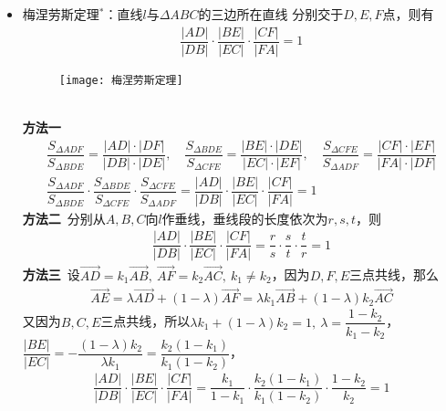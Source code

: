 \begin{itemize}[leftmargin=\inteval{\myitemleftmargin}pt,itemsep=
   \inteval{\myitemitempsep}pt,topsep=\inteval{\myitemtopsep}pt]
\item 梅涅劳斯定理$ ^* $：直线$ l $与$ \Delta ABC $的三边所在直线
分别交于$ D,E,F $点，则有
\begin{gather*}
    \dfrac{|AD|}{|DB|} \cdot \dfrac{|BE|}{|EC|} \cdot
    \dfrac{|CF|}{|FA|}=1
\end{gather*}
\begin{figure}[h]
    \centering
    \texttt{[image: 梅涅劳斯定理]}
\end{figure} \\
\textbf{方法一}\ 
\begin{gather*}
    \dfrac{S_{\Delta ADF}}{S_{\Delta BDE}}=\dfrac{|AD|\cdot|DF|}{|DB|\cdot|DE|},\quad
    \dfrac{S_{\Delta BDE}}{S_{\Delta CFE}}=\dfrac{|BE|\cdot|DE|}{|EC|\cdot|EF|},\quad
    \dfrac{S_{\Delta CFE}}{S_{\Delta ADF}}=\dfrac{|CF|\cdot|EF|}{|FA|\cdot|DF|} \\
    \dfrac{S_{\Delta ADF}}{S_{\Delta BDE}}\cdot\dfrac{S_{\Delta BDE}}{S_{\Delta CFE}}
    \cdot\dfrac{S_{\Delta CFE}}{S_{\Delta ADF}}=\dfrac{|AD|}{|DB|} \cdot
    \dfrac{|BE|}{|EC|} \cdot \dfrac{|CF|}{|FA|}=1
\end{gather*}
\textbf{方法二}\ 分别从$ A,B,C $向$ l $作垂线，垂线段的长度依次为$ r,s,t $，则
\begin{align*}
    \dfrac{|AD|}{|DB|} \cdot	\dfrac{|BE|}{|EC|} \cdot \dfrac{|CF|}{|FA|}=
    \dfrac{r}{s} \cdot \dfrac{s}{t} \cdot \dfrac{t}{r}= 1
\end{align*}
\textbf{方法三}\ 设$ \vec{AD}=k_1\vec{AB},\ \vec{AF}=
k_2\vec{AC},\ k_1\neq k_2 $，因为$ D,F,E $三点共线，那么
\begin{gather*}
    \vec{AE}=\lambda \vec{AD}+(1-\lambda)\vec{AF}=
    \lambda k_1\vec{AB}+(1-\lambda)k_2\vec{AC}
\end{gather*}
又因为$ B,C,E $三点共线，所以$ \lambda k_1+(1-\lambda)k_2=1,\ \lambda=\dfrac{1-k_2}
{k_1-k_2} $，$ \dfrac{|BE|}{|EC|} =-\dfrac{(1-\lambda)k_2}{\lambda k_1} =
\dfrac{k_2(1-k_1)}{k_1(1-k_2)} $，
\begin{align*}
    \dfrac{|AD|}{|DB|} \cdot	\dfrac{|BE|}{|EC|} \cdot \dfrac{|CF|}{|FA|}=
    \dfrac{k_1}{1-k_1}\cdot \dfrac{k_2(1-k_1)}{k_1(1-k_2)}\cdot\dfrac{1-k_2}{k_2}=1
\end{align*}


\end{itemize}
